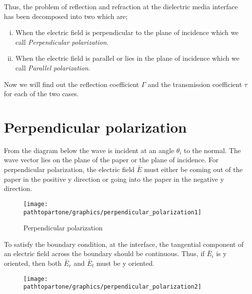 Thus, the problem of reflection and refraction at the dielectric media interface has been decomposed into two which are;

\begin{enumerate}[(i)]
\item When the electric field is perpendicular to the plane of incidence which we call \emph{Perpendicular polarization}.
\item When the electric field is parallel or lies in the plane of incidence which we call \emph{Parallel polarization}.
\end{enumerate}

Now we will find out the reflection coefficient $\Gamma$ and the transmission coefficient $\tau$ for each of the two cases.

\section{Perpendicular polarization} 
From the diagram below the wave is incident at an angle $\theta_{i}$ to the normal. The wave vector lies on the plane of the paper or the plane of incidence. For perpendicular polarization, the electric field $\bar{E}$ must either be coming out of the paper in the positive y direction or going into the paper in the negative y direction.
\begin{figure}[h]
\centering
\texttt{[image: \\pathtopartone/graphics/perpendicular\_polarization1]}
\caption{Perpendicular polarization}
\label{fig:12}
\end{figure}

To satisfy the boundary condition, at the interface, the tangential component of an electric field across the boundary should be continuous. Thus, if $\bar{E}_{i}$ is y oriented, then both  $\bar{E}_{r}$ and  $\bar{E}_{t}$ must be y oriented.
\begin{figure}[h]
\centering
\texttt{[image: \\pathtopartone/graphics/perpendicular\_polarization2]}
\caption{}
\label{fig:perpendicular_polarization2}
\end{figure}

